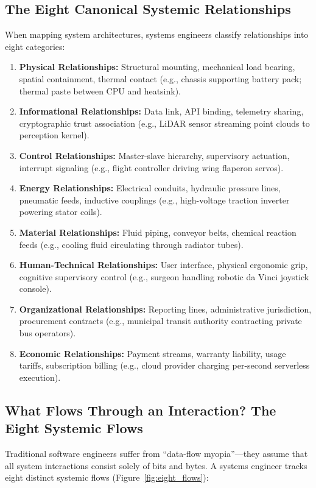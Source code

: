 \subsection{The Eight Canonical Systemic Relationships}
When mapping system architectures, systems engineers classify relationships into eight categories:
\begin{enumerate}[leftmargin=2em]
    \item \textbf{Physical Relationships:} Structural mounting, mechanical load bearing, spatial containment, thermal contact (e.g., chassis supporting battery pack; thermal paste between CPU and heatsink).
    \item \textbf{Informational Relationships:} Data link, API binding, telemetry sharing, cryptographic trust association (e.g., LiDAR sensor streaming point clouds to perception kernel).
    \item \textbf{Control Relationships:} Master-slave hierarchy, supervisory actuation, interrupt signaling (e.g., flight controller driving wing flaperon servos).
    \item \textbf{Energy Relationships:} Electrical conduits, hydraulic pressure lines, pneumatic feeds, inductive couplings (e.g., high-voltage traction inverter powering stator coils).
    \item \textbf{Material Relationships:} Fluid piping, conveyor belts, chemical reaction feeds (e.g., cooling fluid circulating through radiator tubes).
    \item \textbf{Human-Technical Relationships:} User interface, physical ergonomic grip, cognitive supervisory control (e.g., surgeon handling robotic da Vinci joystick console).
    \item \textbf{Organizational Relationships:} Reporting lines, administrative jurisdiction, procurement contracts (e.g., municipal transit authority contracting private bus operators).
    \item \textbf{Economic Relationships:} Payment streams, warranty liability, usage tariffs, subscription billing (e.g., cloud provider charging per-second serverless execution).
\end{enumerate}

\subsection{What Flows Through an Interaction? The Eight Systemic Flows}
Traditional software engineers suffer from ``data-flow myopia''—they assume that all system interactions consist solely of bits and bytes. A systems engineer tracks eight distinct systemic flows (Figure~\ref{fig:eight_flows}):

